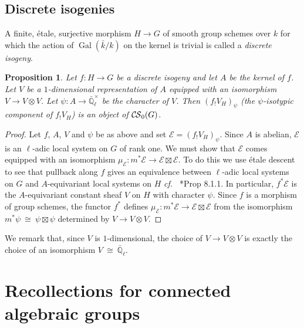 \documentclass[10pt]{amsart}
\theoremstyle{plain}
\newtheorem{proposition}[theorem]{Proposition}
\theoremstyle{definition}
\theoremstyle{remark}
\newcommand{\EE}{\mathbb{\bar Q}_\ell}
\newcommand{\bFq}{\bar{k}}
\newcommand{\Fq}{k}
\newcommand{\EEx}{\EE^\times}
\DeclareMathOperator{\Gal}{Gal}
\newcommand{\iso}{{\ \cong\ }}
\newcommand{\cs}[1]{{\mathcal{#1}}}
\newcommand{\CS}{{\mathcal{C\hskip-0.8pt S}}}
\newcommand{\bCS}{{\CS_0}}
\begin{document}
\subsection{Discrete isogenies}\label{ssec:discrete_isogenies}

A finite, \'etale, surjective morphism $H\to G$ of smooth group schemes over $\Fq$ for which the action of $\Gal(\bFq/\Fq)$ on the kernel is trivial is called a {\it discrete isogeny}.

\begin{proposition}\label{prop:finite}
Let $f: H \to G$ be a discrete isogeny and let $A$ be the kernel of $f$.
Let $V$ be a $1$-dimensional representation of $A$ 
equipped with an isomorphism $V\to V\otimes V$.
Let $\psi : A \to \EEx$ be the character of $V$.
Then $(f_! V_H)_\psi$ (the $\psi$-isotypic component of $f_!V_H$) is an object of $\bCS(G)$.
\end{proposition}

\begin{proof}
Let $f$, $A$, $V$ and $\psi$ be as above and set $\cs{E} = (f_! V_H)_\psi$.
Since $A$ is abelian, $\cs{E}$ is an $\ell$-adic local system on $G$ of rank one.
We must show that $\cs{E}$ comes equipped with an isomorphism $\mu_\cs{E} : m^* \cs{E} \to \cs{E}\boxtimes\cs{E}$.
To do this we use \'etale descent to see that pullback along $f$ gives an equivalence between $\ell$-adic local systems on $G$ and $A$-equivariant local systems on $H$ {\it cf.\ } \cite{bernstein-luntz:equivariant_sheaves}*{Prop 8.1.1}. 
In particular, $f^*\cs{E}$ is the $A$-equivariant constant sheaf $V$ on $H$ with character $\psi$.
Since $f$ is a morphism of group schemes, the functor $f^*$ defines $\mu_\cs{E} : m^*\cs{E} \to \cs{E}\boxtimes\cs{E}$
from the isomorphism $m^*\psi \iso \psi \boxtimes\psi$ determined by $V\to V\otimes V$.
\end{proof}

We remark that, since $V$ is $1$-dimensional, the choice of $V \to V\otimes V$ is exactly the choice of an isomorphism $V\iso \EE$.

\section{Recollections for connected algebraic groups}\label{ssec:connected}

\end{document}
